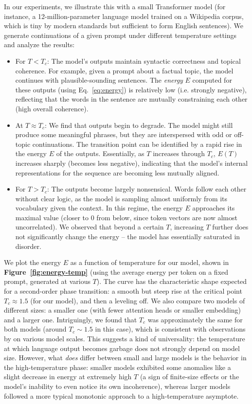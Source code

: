 \documentclass[12pt]{article}
\begin{document}
In our experiments, we illustrate this with a small Transformer model (for instance, a 12-million-parameter language model trained on a Wikipedia corpus, which is tiny by modern standards but sufficient to form English sentences). We generate continuations of a given prompt under different temperature settings and analyze the results:
\begin{itemize}
    \item For $T < T_c$: The model's outputs maintain syntactic correctness and topical coherence. For example, given a prompt about a factual topic, the model continues with plausible-sounding sentences. The \textit{energy} $E$ computed for these outputs (using Eq.~\ref{eq:energy}) is relatively low (i.e. strongly negative), reflecting that the words in the sentence are mutually constraining each other (high overall coherence).
    \item At $T \approx T_c$: We find that outputs begin to degrade. The model might still produce some meaningful phrases, but they are interspersed with odd or off-topic continuations. The transition point can be identified by a rapid rise in the energy $E$ of the outputs. Essentially, as $T$ increases through $T_c$, $E(T)$ increases sharply (becomes less negative), indicating that the model's internal representations for the sequence are becoming less mutually aligned.
    \item For $T > T_c$: The outputs become largely nonsensical. Words follow each other without clear logic, as the model is sampling almost uniformly from its vocabulary given the context. In this regime, the energy $E$ approaches its maximal value (closer to 0 from below, since token vectors are now almost uncorrelated). We observed that beyond a certain $T$, increasing $T$ further does not significantly change the energy -- the model has essentially saturated in disorder.
\end{itemize}

We plot the energy $E$ as a function of temperature for our model, shown in \textbf{Figure~\ref{fig:energy-temp}} (using the average energy per token on a fixed prompt, generated at various $T$). The curve has the characteristic shape expected for a second-order phase transition: a smooth but steep rise at the critical point $T_c \approx 1.5$ (for our model), and then a leveling off. We also compare two models of different sizes: a smaller one (with fewer attention heads or smaller embedding) and a larger one. Intriguingly, we found that $T_c$ was approximately the same for both models (around $T_c \sim 1.5$ in this case), which is consistent with observations by \citet{sun2025} on various model scales. This suggests a kind of universality: the temperature at which language output becomes garbage does not strongly depend on model size. However, what \emph{does} differ between small and large models is the behavior in the high-temperature phase: smaller models exhibited some anomalies like a slight decrease in energy at extremely high $T$ (a sign of finite-size effects or the model's inability to even notice its own incoherence), whereas larger models followed a more typical monotonic approach to a high-temperature asymptote.
\end{document}
